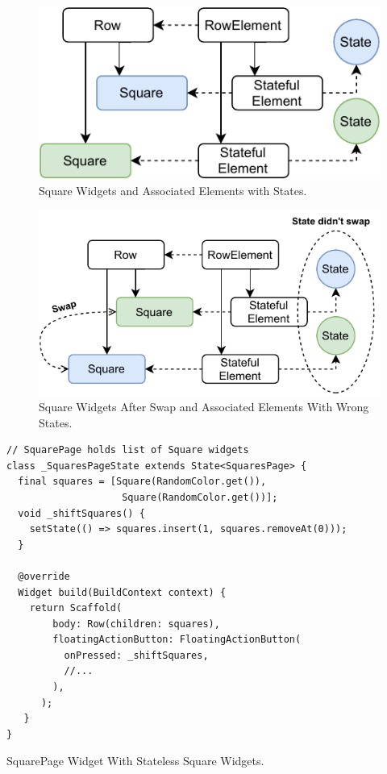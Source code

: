 \begin{figure}[ht]
    \centering
    \includegraphics[width=0.75\linewidth]{img/flutter/key_stateful_start.pdf}
    \caption{Square Widgets and Associated Elements with States.}
    \label{fig:keys_start}
\end{figure}

\begin{figure}[ht]
    \centering
    \includegraphics[width=0.75\linewidth]{img/flutter/key_stateful_wrong_state.pdf}
    \caption{Square Widgets After Swap and Associated Elements With Wrong States.}
    \label{fig:keys_wrong}
\end{figure}

\begin{listing}[ht]
\begin{verbatim}
// SquarePage holds list of Square widgets
class _SquaresPageState extends State<SquaresPage> {
  final squares = [Square(RandomColor.get()), 
                    Square(RandomColor.get())];
  void _shiftSquares() {
    setState(() => squares.insert(1, squares.removeAt(0)));
  }

  @override
  Widget build(BuildContext context) {
    return Scaffold(
        body: Row(children: squares),
        floatingActionButton: FloatingActionButton(
          onPressed: _shiftSquares,
          //...
        ),
      );
   }
}
\end{verbatim}
\caption{SquarePage Widget With Stateless Square Widgets.}
\label{listing:keys_page_stateless}
\end{listing}

